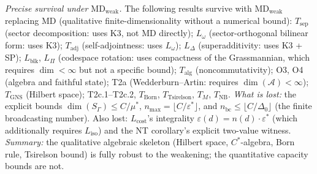 \documentclass[11pt,a4paper]{article}
\theoremstyle{definition}
\newcommand{\eps}{\varepsilon}
\begin{document}
\begin{tcolorbox}[apfbox, title={MD: Uniform Per-Test Cost Floor (Regularity Condition)}]
\smallskip\noindent\textit{Precise survival under $\mathrm{MD}_{\mathrm{weak}}$.}  The following results survive with $\mathrm{MD}_{\mathrm{weak}}$ replacing MD (qualitative finite-dimensionality without a numerical bound):  $T_{\mathrm{sep}}$ (sector decomposition: uses K3, not MD directly); $L_\omega$ (sector-orthogonal bilinear form: uses K3); $T_{\mathrm{adj}}$ (self-adjointness: uses $L_\omega$); $L_\Delta$ (superadditivity: uses K3 + SP); $L_{\mathrm{blk}}$, $L_\Pi$ (codespace rotation: uses compactness of the Grassmannian, which requires $\dim < \infty$ but not a specific bound); $T_{\mathrm{alg}}$ (noncommutativity); O3, O4 (algebra and faithful state); T2a (Wedderburn--Artin: requires $\dim(\mathcal{A}) < \infty$); $T_{\mathrm{GNS}}$ (Hilbert space); T2c.1--T2c.2, $T_{\mathrm{Born}}$, $T_{\mathrm{Tsirelson}}$, $T_M$, $T_{\mathrm{NB}}$.  \textit{What is lost:} the explicit bounds $\dim(S_\Gamma) \le C/\mu^*$, $n_{\max} = \lfloor C/\eps^*\rfloor$, and $n_{\mathrm{bc}} \le \lfloor C/\Delta_0\rfloor$ (the finite broadcasting number).  Also lost: $L_{\mathrm{cost}}$'s integrality $\eps(d) = n(d) \cdot \eps^*$ (which additionally requires $L_{\mathrm{iso}}$) and the NT corollary's explicit two-value witness.  \textit{Summary:} the qualitative algebraic skeleton (Hilbert space, $C^*$-algebra, Born rule, Tsirelson bound) is fully robust to the weakening; the quantitative capacity bounds are not.


\end{tcolorbox}
\end{document}
